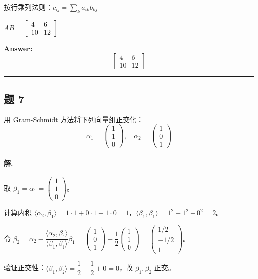 \documentclass[12pt, a4paper]{article}
\newcommand{\problem}[1]{\subsection*{题 #1}}
\newcommand{\solution}{\paragraph{解.}}
\begin{document}
按行乘列法则：$c_{ij} = \sum_k a_{ik} b_{kj}$

$AB = \left[\begin{matrix}4 & 6\\10 & 12\end{matrix}\right]$

\textbf{Answer:}
\[\boxed{\left[\begin{matrix}4 & 6\\10 & 12\end{matrix}\right]}\]

\vspace{1em}
\hrule
\vspace{1em}

\problem{7}

用 Gram-Schmidt 方法将下列向量组正交化：
$$\alpha_1 = \begin{pmatrix} 1 \\ 1 \\ 0 \end{pmatrix} , \quad \alpha_2 = \begin{pmatrix} 1 \\ 0 \\ 1 \end{pmatrix}$$

\solution

取 $\beta_1=\alpha_1=\begin{pmatrix}1\\1\\0\end{pmatrix}$。

计算内积 $\langle\alpha_2,\beta_1\rangle=1\cdot1+0\cdot1+1\cdot0=1$，$\langle\beta_1,\beta_1\rangle=1^2+1^2+0^2=2$。

令 $\beta_2=\alpha_2-\dfrac{\langle\alpha_2,\beta_1\rangle}{\langle\beta_1,\beta_1\rangle}\beta_1=\begin{pmatrix}1\\0\\1\end{pmatrix}-\dfrac{1}{2}\begin{pmatrix}1\\1\\0\end{pmatrix}=\begin{pmatrix}1/2\\-1/2\\1\end{pmatrix}$。

验证正交性：$\langle\beta_1,\beta_2\rangle=\dfrac12-\dfrac12+0=0$，故 $\beta_1,\beta_2$ 正交。
\end{document}
